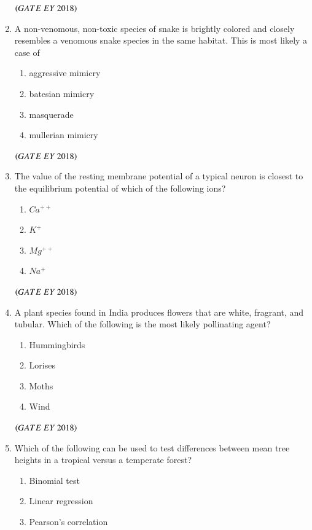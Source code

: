 \documentclass[journal]{IEEEtran}
\numberwithin{equation}{enumi}
\numberwithin{figure}{enumi}
\begin{document}
\begin{enumerate}
    \hfill{$\brak{ GATE\ EY\ 2018}$}
    \bigskip
\item A non-venomous, non-toxic species of snake is brightly colored and closely
resembles a venomous snake species in the same habitat. This is most likely a case
of
    \begin{enumerate}
        \item aggressive mimicry
        \item batesian mimicry
        \item masquerade
        \item mullerian mimicry
    \end{enumerate}
    \hfill{$\brak{ GATE\ EY\ 2018}$}
    \bigskip
\item The value of the resting membrane potential of a typical neuron is closest to the
equilibrium potential of which of the following ions?
\begin{multicols}{4}
    \begin{enumerate}
        \item $Ca^{++}$
        \item $K^+$
        \item $Mg^{++}$
        \item $Na^+$
    \end{enumerate}
    \end{multicols}
    \hfill{$\brak{ GATE\ EY\ 2018}$}
    \bigskip
\item A plant species found in India produces flowers that are white, fragrant, and tubular.
Which of the following is the most likely pollinating agent?
\begin{multicols}{2}
    \begin{enumerate}
        \item Hummingbirds
        \item Lorises
        \item Moths
        \item Wind    
    \end{enumerate}
    \end{multicols}
    \hfill{$\brak{ GATE\ EY\ 2018}$}
    \bigskip
\item Which of the following can be used to test differences between mean tree heights in
a tropical versus a temperate forest?
    \begin{enumerate}
        \item Binomial test
        \item Linear regression
        \item Pearson's correlation

\end{enumerate}
\end{enumerate}
\end{document}
